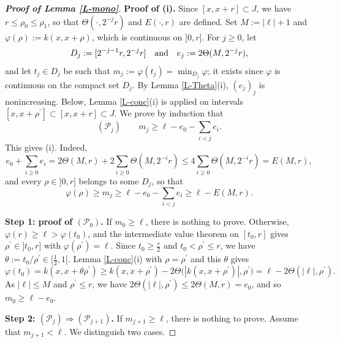 \documentclass[reqno,12pt]{amsart}
\numberwithin{equation}{section}
\def\then{\Rightarrow}
\theoremstyle{remark}
\begin{document}
\begin{proof}[\bf Proof of Lemma \ref{L-mono}]
{\bf Proof of (i).} Since $[x,x+r]\subset J$, we have $r\leq\rho_0\leq\rho_1$, so that $\Theta(\cdot,2^{-j}r)$ and $E(\cdot,r)$ are defined. Set $M:=|\ell|+1$ and $\varphi(\rho):=k(x,x+\rho)$, which is continuous on $]0,r]$. For $j\geq0$, let
\begin{equation*}
D_j:=[2^{-j-1}r,2^{-j}r]\quad\hbox{and}\quad e_j:=2\Theta(M,2^{-j}r),
\end{equation*}
and let $t_j\in D_j$ be such that $m_j:=\varphi(t_j)=\min_{D_j}\varphi$; it exists since $\varphi$ is continuous on the compact set $D_j$. By Lemma \ref{L-Theta}(i), $(e_j)_j$ is nonincreasing. Below, Lemma \ref{L-conc}(i) is applied on intervals $[x,x+\rho^\prime]\subset[x,x+r]\subset J$. We prove by induction that
\begin{equation*}
(\mathcal{P}_j)\qquad m_j\geq\ell-e_0-\sum_{i<j}e_i.
\end{equation*}
This gives (i). Indeed,
\begin{equation*}
e_0+\sum_{i\geq0}e_i=2\Theta(M,r)+2\sum_{i\geq0}\Theta(M,2^{-i}r)\leq4\sum_{i\geq0}\Theta(M,2^{-i}r)=E(M,r),
\end{equation*}
and every $\rho\in]0,r]$ belongs to some $D_j$, so that
\begin{equation*}
\varphi(\rho)\geq m_j\geq\ell-e_0-\sum_{i<j}e_i\geq\ell-E(M,r).
\end{equation*}

\medskip

{\bf Step 1: proof of \boldmath$(\mathcal{P}_0)$\unboldmath.} If $m_0\geq\ell$, there is nothing to prove. Otherwise, $\varphi(r)\geq\ell>\varphi(t_0)$, and the intermediate value theorem on $[t_0,r]$ gives $\rho^\prime\in]t_0,r]$ with $\varphi(\rho^\prime)=\ell$. Since $t_0\geq\frac r2$ and $t_0<\rho^\prime\leq r$, we have $\theta:=t_0/\rho^\prime\in[\frac12,1[$. Lemma \ref{L-conc}(i) with $\rho=\rho^\prime$ and this $\theta$ gives
\begin{equation*}
\varphi(t_0)=k(x,x+\theta\rho^\prime)\geq k(x,x+\rho^\prime)-2\Theta\big(|k(x,x+\rho^\prime)|,\rho^\prime\big)=\ell-2\Theta(|\ell|,\rho^\prime).
\end{equation*}
As $|\ell|\leq M$ and $\rho^\prime\leq r$, we have $2\Theta(|\ell|,\rho^\prime)\leq2\Theta(M,r)=e_0$, and so $m_0\geq\ell-e_0$.

\medskip

{\bf Step 2: \boldmath$(\mathcal{P}_j)\then(\mathcal{P}_{j+1})$\unboldmath.} If $m_{j+1}\geq\ell$, there is nothing to prove. Assume that $m_{j+1}<\ell$. We distinguish two cases.


\end{proof}
\end{document}
